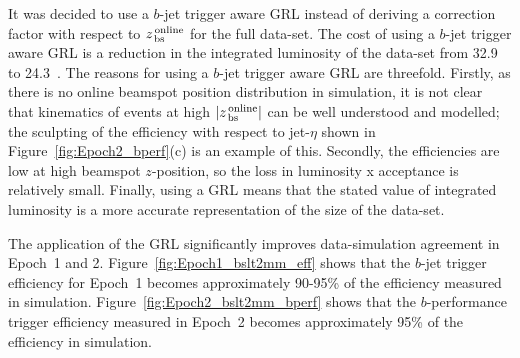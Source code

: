It was decided to use a $b$-jet trigger aware GRL instead of deriving a correction factor with respect to $z_{\,\text{bs}}^{\text{\,online}}$ for the full data-set.
The cost of using a $b$-jet trigger aware GRL is a reduction in the integrated luminosity of the data-set from  32.9~\ifb{} to 24.3~\ifb.
The reasons for using a $b$-jet trigger aware GRL are threefold.
Firstly, as there is no online beamspot position distribution in simulation, it is not clear that kinematics of events at high $|z_{\,\text{bs}}^{\text{\,online}}|$ can be well understood and modelled;
the sculpting of the efficiency with respect to jet-$\eta$ shown in Figure~\ref{fig:Epoch2_bperf}(c) is an example of this.
Secondly, the efficiencies are low at high beamspot $z$-position,
so the loss in luminosity x acceptance is relatively small.
Finally, using a GRL means that the stated value of integrated luminosity is a more accurate representation of the size of the data-set.

The application of the GRL significantly improves data-simulation agreement in Epoch~1 and 2.
Figure~\ref{fig:Epoch1_bslt2mm_eff} shows that the $b$-jet trigger efficiency for Epoch~1 becomes approximately 90-95\% of the efficiency measured in simulation.
Figure~\ref{fig:Epoch2_bslt2mm_bperf} shows that the \mbox{$b$-performance} trigger efficiency measured in Epoch~2 becomes approximately 95\% of the efficiency in simulation.

